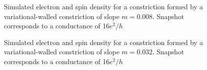 \begin{figure}[h]
\caption{Simulated electron and spin density for a constriction formed by a variational-walled constriction of slope $m=0.008$. Snapshot corresponds to a conductance of 16$e^2/h$}
\end{figure}
\begin{figure}[h]
\caption{Simulated electron and spin density for a constriction formed by a variational-walled constriction of slope $m=0.032$. Snapshot corresponds to a conductance of 16$e^2/h$ }
\end{figure}
\FloatBarrier
